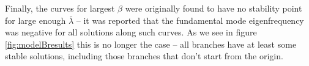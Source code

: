 \documentclass[12pt,noshowpacs,nofootinbib,notitlepage,amsmath,superscriptaddress]{revtex4-1}%
\newcommand{\mg}[1]{{\color{blue}\bf [Michael: #1]}}
\newcommand{\yb}[1]{{\color{orange}\bf [Yann: #1]}}
\newcommand{\tcr}{\textcolor{red}}
\begin{document}
Finally,  the curves for largest $\beta$   were originally found to have   no stability point for large enough $\bar{\lambda}$  \cite{zhang:2021} -- it was reported that the fundamental mode eigenfrequency was negative for all solutions along such curves. As we see in figure \ref{fig:modelBresults} this is no longer the case  -- all branches have at least some stable solutions, including those branches that don't start from the origin.





\end{document}

